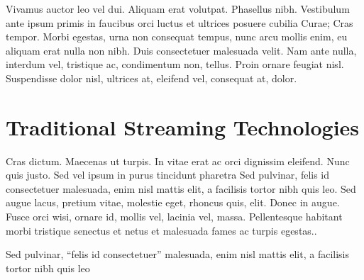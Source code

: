 \cleardoublepage
\label{chap:back}

Vivamus auctor leo vel dui. Aliquam erat volutpat. Phasellus nibh. Vestibulum ante ipsum primis in faucibus orci luctus et ultrices posuere cubilia Curae; Cras tempor. Morbi egestas, urna non consequat tempus, nunc arcu mollis enim, eu aliquam erat nulla non nibh. Duis consectetuer malesuada velit. Nam ante nulla, interdum vel, tristique ac, condimentum non, tellus. Proin ornare feugiat nisl. Suspendisse dolor nisl, ultrices at, eleifend vel, consequat at, dolor.
\section{Traditional Streaming Technologies}
Cras dictum. Maecenas ut turpis. In vitae erat ac orci dignissim eleifend. Nunc quis justo. Sed vel ipsum in purus tincidunt pharetra Sed pulvinar, felis id consectetuer malesuada, enim nisl mattis elit, a facilisis tortor nibh quis leo. Sed augue lacus, pretium vitae, molestie eget, rhoncus quis, elit. Donec in augue. Fusce orci wisi, ornare id, mollis vel, lacinia vel, massa. Pellentesque habitant morbi tristique senectus et netus et malesuada fames ac turpis egestas..

Sed pulvinar, \enquote{felis id consectetuer} malesuada, enim nisl mattis elit, a facilisis tortor nibh quis leo %

